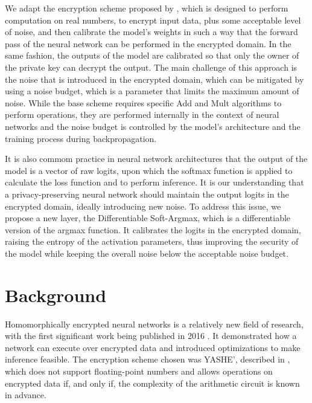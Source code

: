 \documentclass{article}
\begin{document}
We adapt the encryption scheme proposed by \cite{cheon2017homomorphic}, which is designed to perform computation on real numbers, to encrypt input data, plus some acceptable level of noise, and then calibrate the model's weights in such a way that the forward pass of the neural network can be performed in the encrypted domain. In the same fashion, the outputs of the model are calibrated so that only the owner of the private key can decrypt the output. The main challenge of this approach is the noise that is introduced in the encrypted domain, which can be mitigated by using a noise budget, which is a parameter that limits the maximum amount of noise. While the base scheme requires specific Add and Mult algorithms to perform operations, they are performed internally in the context of neural networks and the noise budget is controlled by the model's architecture and the training process during backpropagation.

It is also commom practice in neural network architectures that the output of the model is a vector of raw logits, upon which the softmax function is applied to calculate the loss function and to perform inference\cite{he2016deep,oord2016wavenet,vaswani2017attention, srivastavan2014dropout}. It is our understanding that a privacy-preserving neural network should maintain the output logits in the encrypted domain, ideally introducing new noise. To address this issue, we propose a new layer, the Differentiable Soft-Argmax, which is a differentiable version of the argmax function. It calibrates the logits in the encrypted domain, raising the entropy of the activation parameters, thus improving the security of the model while keeping the overall noise below the acceptable noise budget.

\vspace{10mm}

\section{Background}

Homomorphically encrypted neural networks is a relatively new field of research, with the first significant work being published in 2016 \cite{gilad2016cryptonets}. It demonstrated how a network can execute over encrypted data and introduced optimizations to make inference feasible. The encryption scheme chosen was YASHE', described in \cite{bos2013improved}, which does not support floating-point numbers and allows operations on encrypted data if, and only if, the complexity of the arithmetic circuit is known in advance. 
\end{document}
